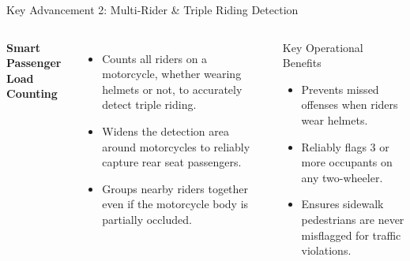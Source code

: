 \documentclass[10pt, compress, aspectratio=169]{beamer}
\begin{document}
\begin{frame}{Key Advancement 2: Multi-Rider \& Triple Riding Detection}
    \begin{columns}[c]
        \textbf{\textcolor{BTPPrimary}{Smart Passenger Load Counting}}
        \vspace{2mm}
        \begin{itemize}\small
            \item Counts all riders on a motorcycle, whether wearing helmets or not, to accurately detect triple riding.
            \item Widens the detection area around motorcycles to reliably capture rear seat passengers.
            \item Groups nearby riders together even if the motorcycle body is partially occluded.
        \end{itemize}

        \begin{block}{Key Operational Benefits}
            \begin{itemize}\small
                \item Prevents missed offenses when riders wear helmets.
                \item Reliably flags 3 or more occupants on any two-wheeler.
                \item Ensures sidewalk pedestrians are never misflagged for traffic violations.
            \end{itemize}
        \end{block}
    \end{columns}
\end{frame}
\end{document}

